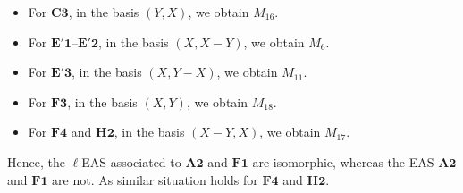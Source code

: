 \documentclass[10pt,a4paper]{amsart}
\numberwithin{equation}{section}
\begin{document}
\begin{Example}
\begin{enumerate}
\begin{itemize}
\item For $\mathbf{C3}$, in the basis $(Y,X)$, we obtain $M_{16}$.
\item For $\mathbf{E'1}\text{--}\mathbf{E'2}$, in the basis $(X,X-Y)$, we obtain $M_6$.
\item For $\mathbf{E'3}$, in the basis $(X,Y-X)$, we obtain $M_{11}$.
\item For $\mathbf{F3}$, in the basis $(X,Y)$, we obtain $M_{18}$.
\item For $\mathbf{F4}$ and $\mathbf{H2}$, in the basis $(X-Y,X)$, we obtain $M_{17}$.
\end{itemize}
Hence, the $\ell$EAS associated to $\mathbf{A2}$ and $\mathbf{F1}$ are isomorphic, whereas the EAS $\mathbf{A2}$ and $\mathbf{F1}$ are not. As similar situation holds for $\mathbf{F4}$ and $\mathbf{H2}$.


\end{enumerate}
\end{Example}
\end{document}
